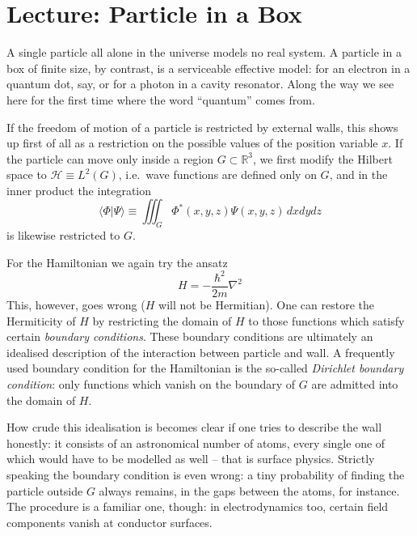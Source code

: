 
\section{Lecture: Particle in a Box}
A single particle all alone in the universe models no real system. A particle in a box of finite size, by contrast, is a serviceable effective model: for an electron in a quantum dot, say, or for a photon in a cavity resonator. Along the way we see here for the first time where the word ``quantum'' comes from.

If the freedom of motion of a particle is restricted by external walls, this shows up first of all as a restriction on the possible values of the position variable $x$. If the particle can move only inside a region $G \subset \mathbb{R}^3$, we first modify the Hilbert space to $\mathcal{H}\equiv L^2(G)$, i.e.\ wave functions are defined only on $G$, and in the
inner product the integration 
\begin{equation}
	\langle \Phi|\Psi\rangle \equiv \iiint_G \Phi^*(x,y,z)\Psi(x,y,z)\, dxdydz
\end{equation}
is likewise restricted to $G$. 

For the Hamiltonian we again try the ansatz 
\begin{equation}
	H = -\frac{\hbar^2}{2m}\nabla^2
\end{equation}
This, however, goes wrong ($H$ will not be Hermitian). One can restore the Hermiticity of $H$ by restricting the domain of $H$ to those functions which satisfy certain \emph{boundary conditions}. These boundary conditions are ultimately an idealised description of the interaction between particle and wall. A frequently used boundary condition for the Hamiltonian is the so-called \emph{Dirichlet boundary condition}: only functions which vanish on the boundary of $G$ are admitted into the domain of $H$.

How crude this idealisation is becomes clear if one tries to describe the wall honestly: it consists of an astronomical number of atoms, every single one of which would have to be modelled as well -- that is surface physics. Strictly speaking the boundary condition is even wrong: a tiny probability of finding the particle outside $G$ always remains, in the gaps between the atoms, for instance. The procedure is a familiar one, though: in electrodynamics too, certain field components vanish at conductor surfaces.

